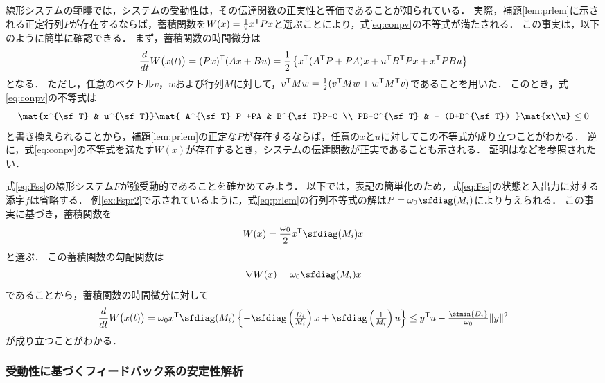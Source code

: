 \documentclass[a4j,10pt,oneside,openany,dvipdfmx]{jsbook}
\begin{document}
線形システムの範疇では，システムの受動性は，その伝達関数の正実性と等価であることが知られている．
実際，補題\ref{lem:prlem}に示される正定行列$P$が存在するならば，蓄積関数を$W(x)=\frac{1}{2}x^{\sf T}Px$と選ぶことにより，式\eqref{eq:conpv}の不等式が満たされる．
この事実は，以下のように簡単に確認できる．
まず，蓄積関数の時間微分は
\[
\frac{d}{dt} W\bigl( x(t) \bigr)
=(Px)^{\sf T}(Ax+Bu) = 
\frac{1}{2}
\left\{
x^{\sf T} (A^{\sf T} P +PA)x 
+ u^{\sf T} B^{\sf T}Px+ x^{\sf T} PBu
\right\}
\]
となる．
ただし，任意のベクトル$v$，$w$および行列$M$に対して，$v^{\sf T}Mw = \frac{1}{2} (v^{\sf T}Mw + w^{\sf T}M^{\sf T}v)$であることを用いた．
このとき，式\eqref{eq:conpv}の不等式は
\[
\mat{x^{\sf T} & u^{\sf T}}
\mat{
A^{\sf T} P +PA & B^{\sf T}P-C \\
PB-C^{\sf T} & - (D+D^{\sf T})
}
\mat{x\\u}
\leq 0
\]
と書き換えられることから，補題\ref{lem:prlem}の正定な$P$が存在するならば，任意の$x$と$u$に対してこの不等式が成り立つことがわかる．
逆に，式\eqref{eq:conpv}の不等式を満たす$W(x)$が存在するとき，システムの伝達関数が正実であることも示される．
証明は\cite[第5.9.1節]{antoulas2005approximation}などを参照されたい．

\begin{example}\label{ex:psF}
式\eqref{eq:Fss}の線形システム$F$が強受動的であることを確かめてみよう．
以下では，表記の簡単化のため，式\eqref{eq:Fss}の状態と入出力に対する添字$f$は省略する．
例\ref{ex:Fspr2}で示されているように，式\eqref{eq:prlem}の行列不等式の解は$P=\omega_0 \sfdiag(M_i)$により与えられる．
この事実に基づき，蓄積関数を
\[
W(x)= \frac{\omega_0}{2}
x^{\sf T}
\sfdiag(M_i)
x
\]
と選ぶ．
この蓄積関数の勾配関数は
\begin{equation}\label{eq:nabWo}
\nabla W(x) = \omega_0 \sfdiag(M_i) x
\end{equation}
であることから，蓄積関数の時間微分に対して
\begin{equation}\label{eq:exFps}
\frac{d}{dt} W \bigl( x(t) \bigr)
= \textstyle
\omega_0  x^{\sf T} \sfdiag(M_i)
\left\{
-\sfdiag \left( 
\frac{D_i}{ M_i} 
\right)x + 
\sfdiag \left( 
\frac{1}{ M_i} 
\right)
u
\right\}
 \leq \textstyle
y^{\sf T} u
- \frac{\sfmin \left\{ D_i \right\}}{\omega_0}
\|y \|^2
\end{equation}
が成り立つことがわかる．
\end{example}


\subsubsection{受動性に基づくフィードバック系の安定性解析}
\end{document}
